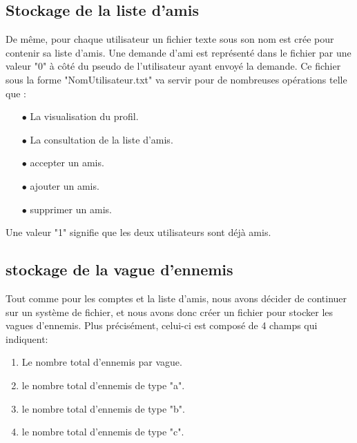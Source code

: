 \documentclass[12pt,a4paper]{article}
\begin{document}
\subsection{Stockage de la liste d'amis}
De même, pour chaque  \gls{utilisateur} un fichier texte sous son nom est crée pour contenir sa liste d'amis. Une demande d'ami est représenté dans le fichier par une valeur "0" à côté du pseudo  de l'utilisateur ayant envoyé la demande. Ce fichier sous la forme "NomUtilisateur.txt" va servir pour de nombreuses opérations telle que :
\begin{itemize}
    \item[$\bullet$] La visualisation du profil.
    \item[$\bullet$] La consultation de la liste d'amis.
    \item[$\bullet$] accepter un amis.
    \item[$\bullet$] ajouter un amis.
    \item[$\bullet$] supprimer un amis.
\end{itemize}
 Une valeur "1" signifie que les deux utilisateurs sont déjà amis.
 \subsection{stockage de la vague d'ennemis}
Tout comme pour les comptes et la liste d'amis, nous avons décider de continuer sur un système de fichier, et nous avons donc créer un fichier pour stocker les vagues d'ennemis. Plus précisément, celui-ci est composé de 4 champs qui indiquent:
\begin{enumerate}
    \item Le nombre total d'ennemis par vague.
    \item le nombre total d'ennemis de type "a".
    \item le nombre total d'ennemis de type "b".
    \item le nombre total d'ennemis de type "c". 
\end{enumerate}
\end{document}
